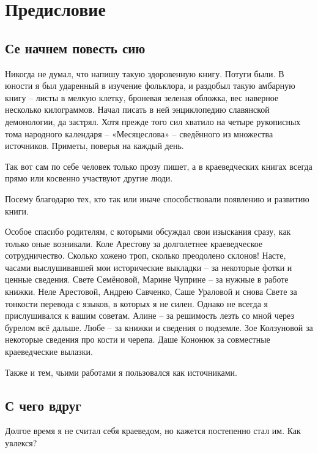 \chapter*{Предисловие}

\section*{Се начнем повесть сию} 

Никогда не думал, что напишу такую здоровенную книгу. Потуги были. В юности я был ударенный в изучение фольклора, и раздобыл такую амбарную книгу – листы в мелкую клетку, броневая зеленая обложка, вес наверное несколько килограммов. Начал писать в ней энциклопедию славянской демонологии, да застрял. Хотя прежде того сил хватило на четыре рукописных тома народного календаря – «Месяцеслова» – сведённого из множества источников. Приметы, поверья на каждый день.

Так вот сам по себе человек только прозу пишет, а в краеведческих книгах всегда прямо или косвенно участвуют другие люди.

Посему благодарю тех, кто так или иначе способствовали появлению и развитию книги.

Особое спасибо родителям, с которыми обсуждал свои изыскания сразу, как только оные возникали. Коле Арестову за долголетнее краеведческое сотрудничество. Сколько хожено троп, сколько преодолено склонов! Насте, часами выслушивавшей мои исторические выкладки – за некоторые фотки и ценные сведения. Свете Семёновой, Марине Чуприне – за нужные в работе книжки. Неле Арестовой, Андрею Савченко, Саше Ураловой и снова Свете за тонкости перевода с языков, в которых я не силен. Однако не всегда я прислушивался к вашим советам. Алине – за решимость лезть со мной через бурелом всё дальше. Любе – за книжки и сведения о подземле. Зое Колзуновой за некоторые сведения про кости и черепа. Даше Кононюк за совместные краеведческие вылазки.

Также и тем, чьими работами я пользовался как источниками.

\section*{С чего вдруг}

Долгое время я не считал себя краеведом, но кажется постепенно стал им. Как увлекся?

